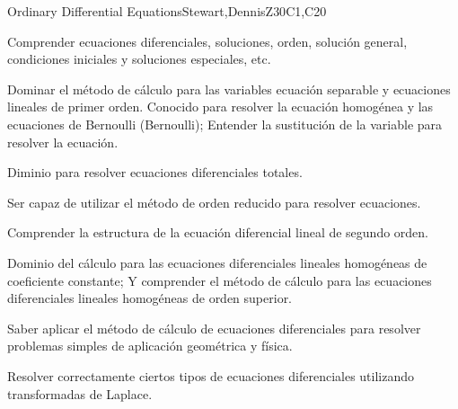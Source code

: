 \begin{syllabus}
\begin{unit}{Ordinary Differential Equations}{}{Stewart,DennisZ}{30}{C1,C20}
   \begin{learningoutcomes}
    \item Comprender ecuaciones diferenciales, soluciones, orden, solución general, condiciones iniciales y soluciones especiales, etc.
    \item Dominar el método de cálculo para las variables ecuación separable y ecuaciones lineales de primer orden. Conocido para resolver la ecuación homogénea y las ecuaciones de Bernoulli (Bernoulli); Entender la sustitución de la variable para resolver la ecuación.
    \item Diminio  para resolver ecuaciones diferenciales totales.
    \item Ser capaz de utilizar el método de orden reducido para resolver ecuaciones.
    \item Comprender la estructura de la ecuación diferencial lineal de segundo orden.
    \item Dominio del cálculo para las ecuaciones diferenciales lineales homogéneas de coeficiente constante; Y comprender el método de cálculo para las ecuaciones diferenciales lineales homogéneas de orden superior.
    \item Saber aplicar el método de cálculo de ecuaciones diferenciales para resolver problemas simples de aplicación geométrica y física.
    \item Resolver correctamente ciertos tipos de ecuaciones diferenciales utilizando transformadas de Laplace.

   \end{learningoutcomes}
\end{unit}

\begin{coursebibliography}
\end{coursebibliography}

\end{syllabus}
